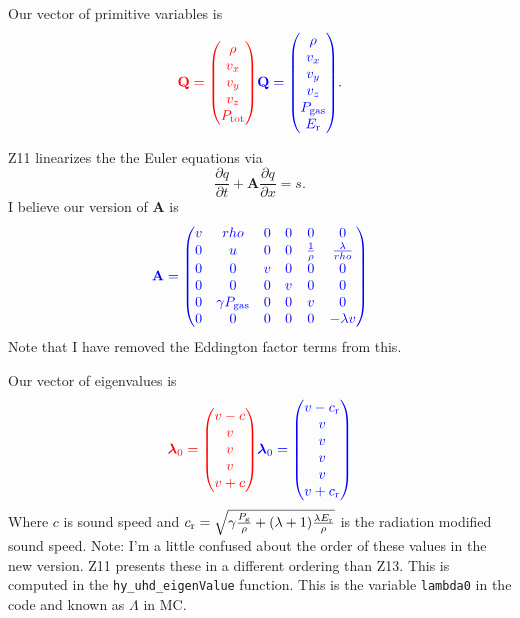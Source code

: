 \documentclass[preprint,11pt]{aastex}
\newcommand{\beq}{\begin{equation}}
\newcommand{\eeq}{\end{equation}}
\begin{document}
Our vector of primitive variables is
\beq
{\color{red}\mathbf{Q} = \begin{pmatrix}\rho\\v_x \\ v_y \\ v_z \\ P_{\rm tot}\end{pmatrix}} {\color{blue}\mathbf{Q} = \begin{pmatrix}\rho\\v_x \\ v_y \\ v_z \\ P_{\rm gas} \\ E_{\rm r}\end{pmatrix}}.
\eeq

Z11 linearizes the the Euler equations via
\beq
\frac{\partial q}{\partial t} + \mathbf{A} \frac{\partial q}{\partial x} = s.
\eeq
I believe our version of $\mathbf{A}$ is
\beq
{
	\color{blue}
	\mathbf{A} = 
	\begin{pmatrix}
	v & rho & 0 & 0 & 0 & 0 \\
	0 & u & 0 & 0 & \frac{1}{\rho} & \frac{\lambda}{rho} \\
	0 & 0 & v & 0 & 0 & 0 \\
	0 & 0 & 0 & v & 0 & 0 \\
	0 & \gamma P_{\rm gas} & 0 & 0 & v & 0 \\
	0 & 0 & 0 & 0 & 0 & -\lambda v
	\end{pmatrix}
}
\eeq
{\color{blue} Note that I have removed the Eddington factor terms from this.}

Our vector of eigenvalues is
\beq
{\color{red}\boldsymbol{\lambda}_0 = \begin{pmatrix}v - c\\v \\ v \\ v \\ v + c\end{pmatrix}}{\color{blue}\boldsymbol{\lambda}_0 = \begin{pmatrix}v - c_{\rm r}\\v \\ v \\ v \\ v \\ v + c_{\rm r}\end{pmatrix}}
\eeq
Where $c$ is sound speed and $c_{\rm r}=\sqrt{\gamma \frac{P_{\rm g}}{\rho} + (\lambda + 1)\frac{\lambda E_{\rm r}}{\rho}}$ is the radiation modified sound speed.  {\color{blue}Note: I'm a little confused about the order of these values in the new version.  Z11 presents these in a different ordering than Z13.}  This is computed in the \verb!hy_uhd_eigenValue! function.  This is the variable \verb!lambda0! in the code and known as $\Lambda$ in MC.
\end{document}
